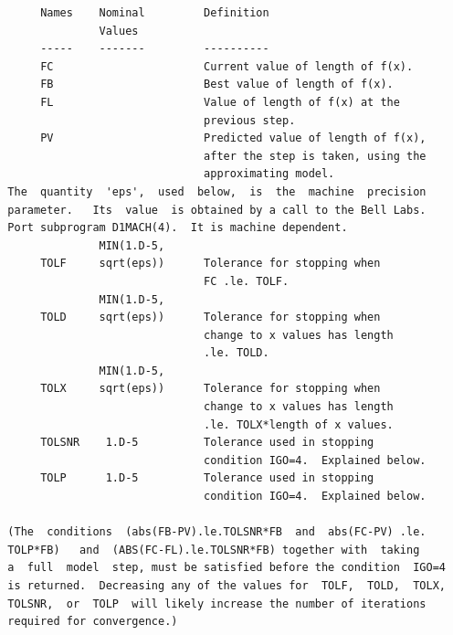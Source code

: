 \documentclass[11pt,twoside]{article}
\begin{document}
\begin{verbatim}
       Names    Nominal         Definition
                Values
       -----    -------         ----------
       FC                       Current value of length of f(x).
       FB                       Best value of length of f(x).
       FL                       Value of length of f(x) at the
                                previous step.
       PV                       Predicted value of length of f(x),
                                after the step is taken, using the
                                approximating model.
  The  quantity  'eps',  used  below,  is  the  machine  precision
  parameter.   Its  value  is obtained by a call to the Bell Labs.
  Port subprogram D1MACH(4).  It is machine dependent.
                MIN(1.D-5,
       TOLF     sqrt(eps))      Tolerance for stopping when
                                FC .le. TOLF.
                MIN(1.D-5,
       TOLD     sqrt(eps))      Tolerance for stopping when
                                change to x values has length
                                .le. TOLD.
                MIN(1.D-5,
       TOLX     sqrt(eps))      Tolerance for stopping when
                                change to x values has length
                                .le. TOLX*length of x values.
       TOLSNR    1.D-5          Tolerance used in stopping
                                condition IGO=4.  Explained below.
       TOLP      1.D-5          Tolerance used in stopping
                                condition IGO=4.  Explained below.

  (The  conditions  (abs(FB-PV).le.TOLSNR*FB  and  abs(FC-PV) .le.
  TOLP*FB)   and  (ABS(FC-FL).le.TOLSNR*FB) together with  taking
  a  full  model  step, must be satisfied before the condition  IGO=4
  is returned.  Decreasing any of the values for  TOLF,  TOLD,  TOLX,
  TOLSNR,  or  TOLP  will likely increase the number of iterations
  required for convergence.)


\end{verbatim}
\end{document}
